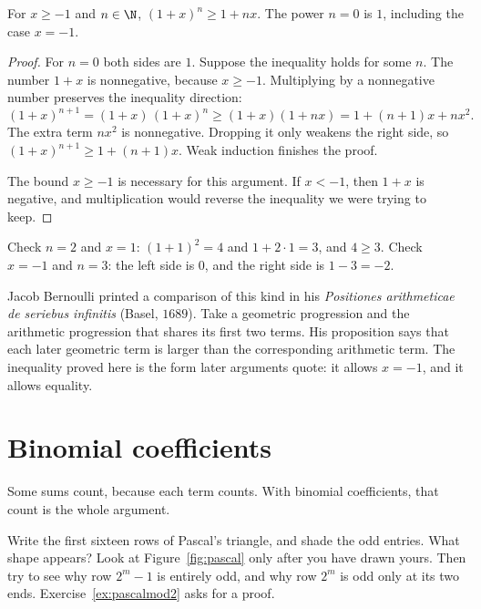 \begin{proposition}\label{prop:bernoulli}
For $x\ge-1$ and $n\in\N$, $(1+x)^n\ge1+nx$. The power $n=0$ is $1$, including the case $x=-1$.
\end{proposition}
\begin{proof}
For $n=0$ both sides are $1$. Suppose the inequality holds for some $n$. The number $1+x$ is nonnegative, because $x\ge-1$. Multiplying by a nonnegative number preserves the inequality direction:
\[
(1+x)^{n+1}=(1+x)\,(1+x)^n\ge(1+x)(1+nx)=1+(n+1)x+nx^2.
\]
The extra term $nx^2$ is nonnegative. Dropping it only weakens the right side, so $(1+x)^{n+1}\ge1+(n+1)x$. Weak induction finishes the proof.

The bound $x\ge-1$ is necessary for this argument. If $x<-1$, then $1+x$ is negative, and multiplication would reverse the inequality we were trying to keep.
\end{proof}

Check $n=2$ and $x=1$: $(1+1)^2=4$ and $1+2\cdot1=3$, and $4\ge3$. Check $x=-1$ and $n=3$: the left side is $0$, and the right side is $1-3=-2$.

Jacob Bernoulli printed a comparison of this kind in his \emph{Positiones arithmeticae de seriebus infinitis} (Basel, $1689$). Take a geometric progression and the arithmetic progression that shares its first two terms. His proposition says that each later geometric term is larger than the corresponding arithmetic term. The inequality proved here is the form later arguments quote: it allows $x=-1$, and it allows equality.


\section{Binomial coefficients}\label{sec:binom}

Some sums count, because each term counts. With binomial coefficients, that count is the whole argument.

\begin{think}
Write the first sixteen rows of Pascal's triangle, and shade the odd entries. What shape appears? Look at Figure~\ref{fig:pascal} only after you have drawn yours. Then try to see why row $2^m-1$ is entirely odd, and why row $2^m$ is odd only at its two ends. Exercise~\ref{ex:pascalmod2} asks for a proof.
\end{think}


